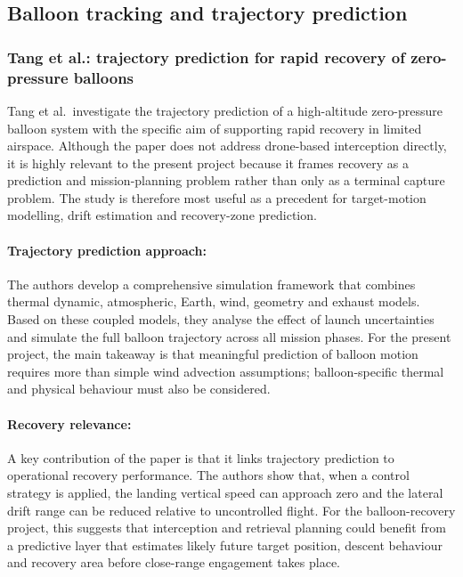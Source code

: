 \subsection{Balloon tracking and trajectory prediction}

\subsubsection{Tang et al.: trajectory prediction for rapid recovery of zero-pressure balloons}
Tang et al.\ investigate the trajectory prediction of a high-altitude zero-pressure balloon system with the specific aim of supporting rapid recovery in limited airspace. Although the paper does not address drone-based interception directly, it is highly relevant to the present project because it frames recovery as a prediction and mission-planning problem rather than only as a terminal capture problem. The study is therefore most useful as a precedent for target-motion modelling, drift estimation and recovery-zone prediction. 

\paragraph{Trajectory prediction approach:} The authors develop a comprehensive simulation framework that combines thermal dynamic, atmospheric, Earth, wind, geometry and exhaust models. Based on these coupled models, they analyse the effect of launch uncertainties and simulate the full balloon trajectory across all mission phases. For the present project, the main takeaway is that meaningful prediction of balloon motion requires more than simple wind advection assumptions; balloon-specific thermal and physical behaviour must also be considered.

\paragraph{Recovery relevance:} A key contribution of the paper is that it links trajectory prediction to operational recovery performance. The authors show that, when a control strategy is applied, the landing vertical speed can approach zero and the lateral drift range can be reduced relative to uncontrolled flight. For the balloon-recovery project, this suggests that interception and retrieval planning could benefit from a predictive layer that estimates likely future target position, descent behaviour and recovery area before close-range engagement takes place. \cite{Tang2022TrajectoryPrediction}

